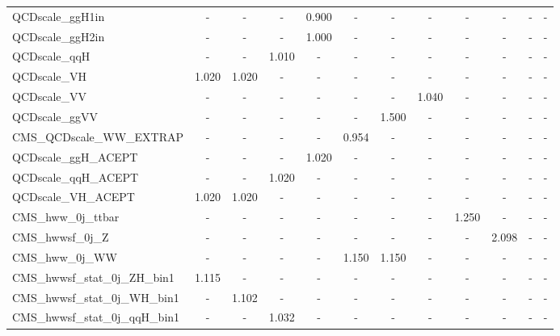 \begin{table}[!ht]
\begin{center}
{\begin{tabular}{l|c|c|c|c|c|c|c|c|c|c|c|}
QCDscale\_ggH1in	             &    -   &   -   &   -   & 0.900 &   -   &   -   &   -   &   -   &   -   &   -   &   -   \\ 
QCDscale\_ggH2in	             &    -   &   -   &   -   & 1.000 &   -   &   -   &   -   &   -   &   -   &   -   &   -   \\ 
QCDscale\_qqH	                     &    -   &   -   & 1.010 &   -   &   -   &   -   &   -   &   -   &   -   &   -   &   -   \\
QCDscale\_VH 	                     &  1.020 & 1.020 &   -   &   -   &   -   &   -   &   -   &   -   &   -   &   -   &   -   \\
QCDscale\_VV 	                     &    -   &   -   &   -   &   -   &   -   &   -   & 1.040 &   -   &   -   &   -   &   -   \\
QCDscale\_ggVV	                     &    -   &   -   &   -   &   -   &   -   & 1.500 &   -   &   -   &   -   &   -   &   -   \\
CMS\_QCDscale\_WW\_EXTRAP            &    -   &   -   &   -   &   -   & 0.954 &   -   &   -   &   -   &   -   &   -   &   -   \\ 
QCDscale\_ggH\_ACEPT                 &    -   &   -   &   -   & 1.020 &   -   &   -   &   -   &   -   &   -   &   -   &   -   \\ 
QCDscale\_qqH\_ACEPT                 &    -   &   -   & 1.020 &   -   &   -   &   -   &   -   &   -   &   -   &   -   &   -   \\ 
QCDscale\_VH\_ACEPT                  &  1.020 & 1.020 &   -   &   -   &   -   &   -   &   -   &   -   &   -   &   -   &   -   \\ 
CMS\_hww\_0j\_ttbar                  &    -   &   -   &   -   &   -   &   -   &   -   &   -   & 1.250 &   -   &   -   &   -   \\ 
CMS\_hwwsf\_0j\_Z                    &    -   &   -   &   -   &   -   &   -   &   -   &   -   &   -   & 2.098 &   -   &   -   \\ 
CMS\_hww\_0j\_WW                     &    -   &   -   &   -   &   -   & 1.150 & 1.150 &   -   &   -   &   -   &   -   &   -   \\ 
CMS\_hwwsf\_stat\_0j\_ZH\_bin1       &  1.115 &   -   &   -   &   -   &   -   &   -   &   -   &   -   &   -   &   -   &   -   \\ 
CMS\_hwwsf\_stat\_0j\_WH\_bin1       &    -   & 1.102 &   -   &   -   &   -   &   -   &   -   &   -   &   -   &   -   &   -   \\ 
CMS\_hwwsf\_stat\_0j\_qqH\_bin1      &    -   &   -   & 1.032 &   -   &   -   &   -   &   -   &   -   &   -   &   -   &   -   \\ 

\end{tabular}}
\end{center}
\end{table}
